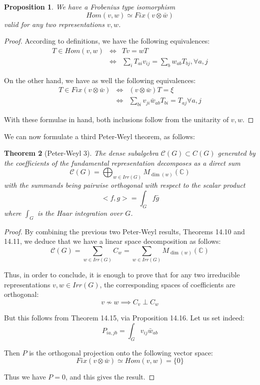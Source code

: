 \documentclass[12pt]{amsbook}
\newtheorem{theorem}{Theorem}[chapter]
\newtheorem{proposition}[theorem]{Proposition}
\begin{document}

\begin{proposition}
We have a Frobenius type isomorphism
$$Hom(v,w)\simeq Fix(v\otimes\bar{w})$$
valid for any two representations $v,w$.
\end{proposition}

\begin{proof}
According to definitions, we have the following equivalences:
\begin{eqnarray*}
T\in Hom(v,w)
&\iff&Tv=wT\\
&\iff&\sum_iT_{ai}v_{ij}=\sum_bw_{ab}T_{bj},\forall a,j
\end{eqnarray*}

On the other hand, we have as well the following equivalences:
\begin{eqnarray*}
T\in Fix(v\otimes\bar{w})
&\iff&(v\otimes\bar{w})T=\xi\\
&\iff&\sum_{bi}v_{ji}\bar{w}_{ab}T_{bi}=T_{aj}\forall a,j
\end{eqnarray*}

With these formulae in hand, both inclusions follow from the unitarity of $v,w$.
\end{proof}

We can now formulate a third Peter-Weyl theorem, as follows:


\begin{theorem}[Peter-Weyl 3]
The dense subalgebra $\mathcal C(G)\subset C(G)$ generated by the coefficients of the fundamental representation decomposes as a direct sum 
$$\mathcal C(G)=\bigoplus_{w\in Irr(G)}M_{\dim(w)}(\mathbb C)$$
with the summands being pairwise orthogonal with respect to the scalar product
$$<f,g>=\int_Gf\bar{g}$$
where $\int_G$ is the Haar integration over $G$.
\end{theorem}

\begin{proof}
By combining the previous two Peter-Weyl results, Theorems 14.10 and 14.11, we deduce that we have a linear space decomposition as follows:
$$\mathcal C(G)
=\sum_{w\in Irr(G)}C_w
=\sum_{w\in Irr(G)}M_{\dim(w)}(\mathbb C)$$

Thus, in order to conclude, it is enough to prove that for any two irreducible representations $v,w\in Irr(G)$, the corresponding spaces of coefficients are orthogonal:
$$v\not\sim w\implies C_v\perp C_w$$ 

But this follows from Theorem 14.15, via Proposition 14.16. Let us set indeed:
$$P_{ia,jb}=\int_Gv_{ij}\bar{w}_{ab}$$

Then $P$ is the orthogonal projection onto the following vector space:
$$Fix(v\otimes\bar{w})
\simeq Hom(v,w)
=\{0\}$$

Thus we have $P=0$, and this gives the result.
\end{proof}
\end{document}
